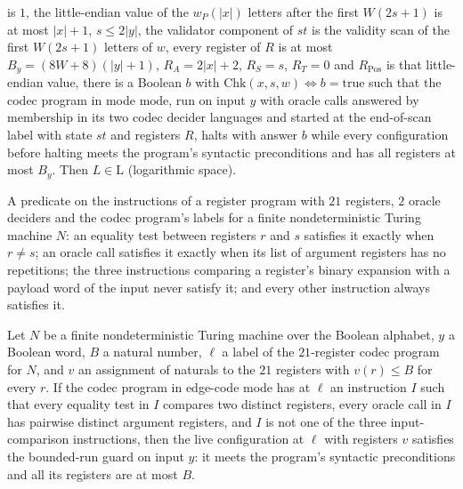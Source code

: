\begin{theorem}
is $1$, the little-endian value of the $w_P(|x|)$ letters after the first $W(2s+1)$ is at most
$|x|+1$, $s\le 2|y|$, the validator component of $st$ is the validity scan of the first
$W(2s+1)$ letters of $w$, every register of $R$ is at most $B_y=(8W+8)(|y|+1)$,
$R_A=2|x|+2$, $R_S=s$, $R_T=0$ and $R_{\mathrm{Pos}}$ is that little-endian value, there is a
Boolean $b$ with $\mathrm{Chk}(x,s,w)\iff b=\mathrm{true}$ such that the codec program in mode
$\mathrm{mode}$, run on input $y$ with oracle calls answered by membership in its two codec
decider languages and started at the end-of-scan label with state $st$ and registers $R$,
halts with answer $b$ while every configuration before halting meets the program's syntactic
preconditions and has all registers at most $B_y$. Then $L\in\mathrm{L}$ (logarithmic space).
\end{theorem}

\begin{definition}
\label{Complexity.Codec.EdgeOK}
\leanok
{}
A predicate on the instructions of a register program with $21$ registers, $2$ oracle deciders
and the codec program's labels for a finite nondeterministic Turing machine $N$: an equality
test between registers $r$ and $s$ satisfies it exactly when $r\ne s$; an oracle call
satisfies it exactly when its list of argument registers has no repetitions; the three
instructions comparing a register's binary expansion with a payload word of the input never
satisfy it; and every other instruction always satisfies it.
\end{definition}

\begin{lemma}
\label{Complexity.Codec.edge_gd}
\leanok
{}
Let $N$ be a finite nondeterministic Turing machine over the Boolean alphabet, $y$ a Boolean
word, $B$ a natural number, $\ell$ a label of the $21$-register codec program for $N$, and
$v$ an assignment of naturals to the $21$ registers with $v(r)\le B$ for every $r$. If the
codec program in edge-code mode has at $\ell$ an instruction $I$ such that every equality test
in $I$ compares two distinct registers, every oracle call in $I$ has pairwise distinct argument
registers, and $I$ is not one of the three input-comparison instructions, then the live
configuration at $\ell$ with registers $v$ satisfies the bounded-run guard on input $y$: it
meets the program's syntactic preconditions and all its registers are at most $B$.
\end{lemma}

